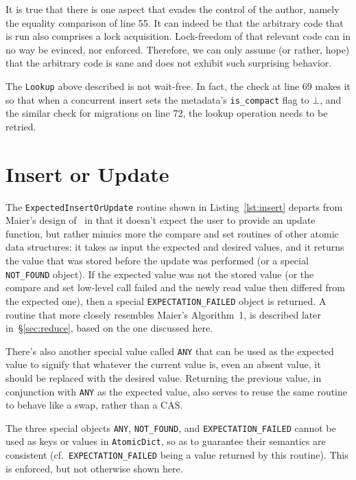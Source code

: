 It is true that there is one aspect that evades the control of the author, namely the equality comparison of line 55.
It can indeed be that the arbitrary code that is run also comprises a lock acquisition.
Lock-freedom of that relevant code can in no way be evinced, nor enforced.
Therefore, we can only assume (or rather, hope) that the arbitrary code is sane and does not exhibit such surprising behavior.

The \texttt{Lookup} above described is not wait-free.
In fact, the check at line 69 makes it so that when a concurrent insert sets the metadata's \texttt{{is\_compact}} flag to $\bot$, and the similar check for migrations on line 72, the lookup operation needs to be retried.


\section{Insert or Update}\label{sec:insert-or-update}

The \texttt{ExpectedInsertOrUpdate} routine shown in Listing~\ref{lst:insert} departs from Maier's design of~\cite[Algorithm~1]{maier} in that it doesn't expect the user to provide an update function, but rather mimics more the compare and set routines of other atomic data structures: it takes as input the expected and desired values, and it returns the value that was stored before the update was performed (or a special \texttt{{NOT\_FOUND}} object).
If the expected value was not the stored value (or the compare and set low-level call failed and the newly read value then differed from the expected one), then a special \texttt{{EXPECTATION\_FAILED}} object is returned.
A routine that more closely resembles Maier's Algorithm~1, is described later in~\S\ref{sec:reduce}, based on the one discussed here.

There's also another special value called \texttt{ANY} that can be used as the expected value to signify that whatever the current value is, even an absent value, it should be replaced with the desired value.
Returning the previous value, in conjunction with \texttt{ANY} as the expected value, also serves to reuse the same routine to behave like a swap, rather than a CAS\@.

The three special objects \texttt{{ANY}}, \texttt{{NOT\_FOUND}}, and \texttt{{EXPECTATION\_FAILED}} cannot be used as keys or values in \texttt{AtomicDict}, so as to guarantee their semantics are consistent (cf.\texttt{\ {EXPECTATION\_FAILED}} being a value returned by this routine).
This is enforced, but not otherwise shown here.

